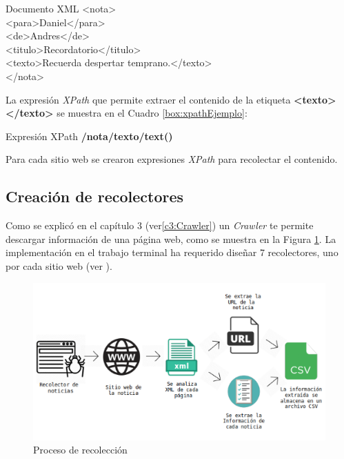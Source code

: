 \begin{mygraybox}[label={box:xmlEjemplo}]{Documento XML} 
<nota>\\
	<para>Daniel</para>\\
	<de>Andres</de>\\
	<titulo>Recordatorio</titulo>\\
	<texto>Recuerda despertar temprano.</texto>\\
</nota>
\end{mygraybox}

La expresión \textit{XPath} que permite extraer el contenido de la etiqueta \textbf{<texto> </texto>} se muestra en el Cuadro \ref{box:xpathEjemplo}: 

\begin{mygraybox}[label={box:xpathEjemplo}]{Expresión XPath} 
\textbf{/nota/texto/text()}
\end{mygraybox}

Para cada sitio web se crearon expresiones \textit{XPath} para recolectar el contenido.

\subsection{Creación de recolectores}

Como se explicó en el capítulo 3 (ver\ref{c3:Crawler}) un \textit{Crawler} te permite descargar información de una página web, como se muestra en la Figura \ref{Fig:recoleccion}. La implementación en el trabajo terminal ha requerido diseñar 7 recolectores, uno por cada sitio web (ver ). \\


\begin{figure}[H]
	\centering
	\includegraphics[scale=.2]{imagenes/Capitulo5/recoleccion.png}
	\caption{Proceso de recolección}
	\label{Fig:recoleccion}
\end{figure}

